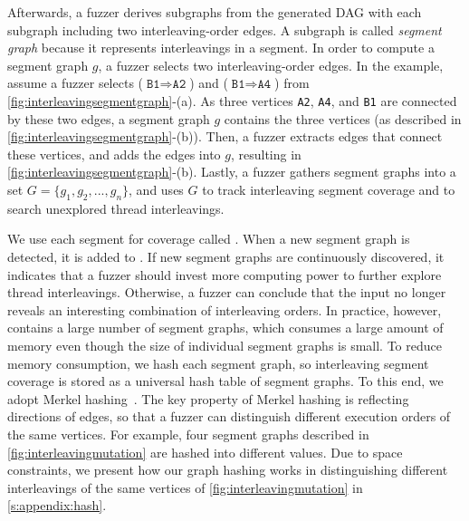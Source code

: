 Afterwards, a fuzzer derives subgraphs from the generated DAG with 
each subgraph including two interleaving-order edges. A subgraph 
is called \textit{segment graph} because it represents interleavings 
in a segment.
%
In order to compute a segment graph $g$, a fuzzer selects two
interleaving-order edges.
%
In the example, assume a fuzzer selects
($\texttt{B1} \Rightarrow \texttt{A2}$) and
($\texttt{B1} \Rightarrow \texttt{A4}$) from
\autoref{fig:interleavingsegmentgraph}-(a).
%
As three vertices \texttt{A2}, \texttt{A4}, and \texttt{B1} are
connected by these two edges, a segment graph $g$ contains the three
vertices (as described in \autoref{fig:interleavingsegmentgraph}-(b)).
%
Then, a fuzzer extracts edges that connect these vertices, and adds
the edges into $g$, resulting in
\autoref{fig:interleavingsegmentgraph}-(b).
%
Lastly, a fuzzer gathers segment graphs into a set
$G = \{g_1, g_2, ..., g_n\}$, and uses $G$ to track interleaving
segment coverage and to search unexplored thread interleavings.
%


We use each segment for coverage called \textit{\intcov}. When a new segment graph is detected, it is added to \intcov.
If new segment graphs are continuously discovered, it indicates that 
a fuzzer should
invest more computing power to further explore thread interleavings.
Otherwise, a fuzzer can conclude that the input no longer
reveals an interesting combination of interleaving orders.
In practice, however, \intcov contains a large number of segment
graphs, which consumes a large amount of memory even though the size
of individual segment graphs is small.
%
To reduce memory consumption, we hash each segment graph, 
so interleaving segment coverage is stored as a universal hash table of segment graphs.
%
To this end, we adopt Merkel hashing~\cite{treehashing, treehashing2}.
%
The key property of Merkel hashing is reflecting directions of edges,
so that a fuzzer can distinguish different execution orders of the same
vertices. For example, four segment graphs described in
\autoref{fig:interleavingmutation} are hashed into different values.
%
Due to space constraints, we present how our graph hashing works in
distinguishing different interleavings of the same vertices of
\autoref{fig:interleavingmutation} in \autoref{s:appendix:hash}.








